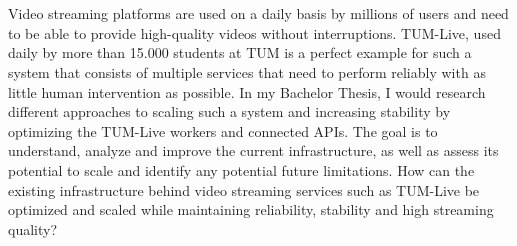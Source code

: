 \chapter{\abstractname}

Video streaming platforms are used on a daily basis by millions of users and need to be able to provide high-quality videos without interruptions. TUM-Live, used daily by more than 15.000 students at TUM is a perfect example for such a system that consists of multiple services that need to perform reliably with as little human intervention as possible.
In my Bachelor Thesis, I would research different approaches to scaling such a system and increasing stability by optimizing the TUM-Live workers and connected APIs. The goal is to understand, analyze and improve the current infrastructure, as well as assess its potential to scale and identify any potential future limitations.
How can the existing infrastructure behind video streaming services such as TUM-Live be optimized and scaled while maintaining reliability, stability and high streaming quality?
